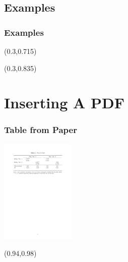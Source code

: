 \documentclass[12pt,aspectratio=169,xcolor=dvipsnames,hyperref={colorlinks=true,linkcolor=blue,citecolor=black}]{beamer}
\begin{document}
\subsection[]{Examples}

\begin{frame}[label=examples]
	\frametitle{Examples}

	\begin{textblock*}{3cm}(0.3\textwidth,0.715\textheight)	%
		\hyperlink{tableex}{}
	\end{textblock*}
	\begin{textblock*}{3cm}(0.3\textwidth,0.835\textheight)	%
		\hyperlink{figureex}{}
	\end{textblock*}
\end{frame}


\section[]{Inserting A PDF}

\begin{frame}[label=tableex]
	\frametitle{Table from Paper}
	\begin{center}
		\includegraphics[trim={3cm 21.15cm 3cm 3cm},clip,height=5cm,width=\textwidth,keepaspectratio]{../Tables/extabpdf.pdf}
	\end{center}
	
	\begin{textblock*}{3cm}(0.94\textwidth,0.98\textheight)	%
		\hyperlink{examples}{}
	\end{textblock*}
\end{frame}
\end{document}
